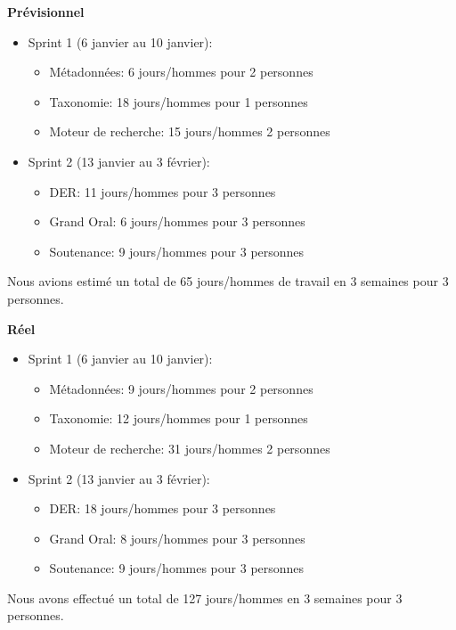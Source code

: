 \textbf{Prévisionnel} 
\begin{itemize}
    \item Sprint 1 (6 janvier au 10 janvier):
        \begin{itemize}
            \item Métadonnées: 6 jours/hommes pour 2 personnes
            \item Taxonomie: 18 jours/hommes pour 1 personnes
            \item Moteur de recherche: 15 jours/hommes 2 personnes
        \end{itemize}
    \item Sprint 2 (13 janvier au 3 février):
    \begin{itemize}
        \item DER\@: 11 jours/hommes pour 3 personnes
        \item Grand Oral: 6 jours/hommes pour 3 personnes
        \item Soutenance:  9 jours/hommes pour 3 personnes
    \end{itemize}
\end{itemize} 

Nous avions estimé un total de 65 jours/hommes de travail en 3 semaines pour 3 personnes.


\textbf{Réel}

\begin{itemize}
    \item Sprint 1 (6 janvier au 10 janvier):
        \begin{itemize}
            \item Métadonnées: 9 jours/hommes pour 2 personnes
            \item Taxonomie: 12 jours/hommes pour 1 personnes
            \item Moteur de recherche: 31 jours/hommes 2 personnes
        \end{itemize}
    \item Sprint 2 (13 janvier au 3 février):
    \begin{itemize}
        \item DER\@: 18 jours/hommes pour 3 personnes
        \item Grand Oral: 8 jours/hommes pour 3 personnes
        \item Soutenance:  9 jours/hommes pour 3 personnes
    \end{itemize}
\end{itemize} 

Nous avons effectué un total de 127 jours/hommes en 3 semaines pour 3 personnes.

